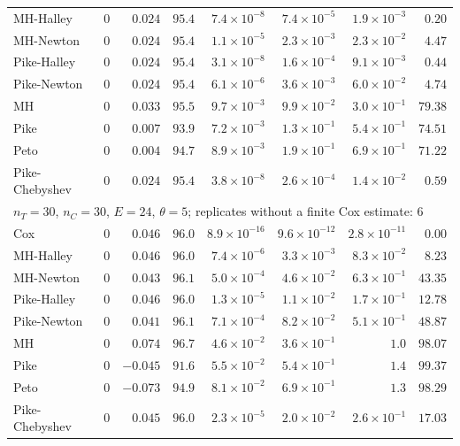 \begin{landscape}
\begin{longtable}{lrrrrrrr}
MH-Halley & 0 & $0.024$ & $95.4$ & $7.4 \times 10^{-8}$ & $7.4 \times 10^{-5}$ & $1.9 \times 10^{-3}$ & $0.20$ \\
MH-Newton & 0 & $0.024$ & $95.4$ & $1.1 \times 10^{-5}$ & $2.3 \times 10^{-3}$ & $2.3 \times 10^{-2}$ & $4.47$ \\
Pike-Halley & 0 & $0.024$ & $95.4$ & $3.1 \times 10^{-8}$ & $1.6 \times 10^{-4}$ & $9.1 \times 10^{-3}$ & $0.44$ \\
Pike-Newton & 0 & $0.024$ & $95.4$ & $6.1 \times 10^{-6}$ & $3.6 \times 10^{-3}$ & $6.0 \times 10^{-2}$ & $4.74$ \\
MH & 0 & $0.033$ & $95.5$ & $9.7 \times 10^{-3}$ & $9.9 \times 10^{-2}$ & $3.0 \times 10^{-1}$ & $79.38$ \\
Pike & 0 & $0.007$ & $93.9$ & $7.2 \times 10^{-3}$ & $1.3 \times 10^{-1}$ & $5.4 \times 10^{-1}$ & $74.51$ \\
Peto & 0 & $0.004$ & $94.7$ & $8.9 \times 10^{-3}$ & $1.9 \times 10^{-1}$ & $6.9 \times 10^{-1}$ & $71.22$ \\
Pike-Chebyshev & 0 & $0.024$ & $95.4$ & $3.8 \times 10^{-8}$ & $2.6 \times 10^{-4}$ & $1.4 \times 10^{-2}$ & $0.59$ \\
\multicolumn{8}{l}{$n_T = 30$, $n_C = 30$, $E = 24$, $\theta = 5$; replicates without a finite Cox estimate: 6} \\
Cox & 0 & $0.046$ & $96.0$ & $8.9 \times 10^{-16}$ & $9.6 \times 10^{-12}$ & $2.8 \times 10^{-11}$ & $0.00$ \\
MH-Halley & 0 & $0.046$ & $96.0$ & $7.4 \times 10^{-6}$ & $3.3 \times 10^{-3}$ & $8.3 \times 10^{-2}$ & $8.23$ \\
MH-Newton & 0 & $0.043$ & $96.1$ & $5.0 \times 10^{-4}$ & $4.6 \times 10^{-2}$ & $6.3 \times 10^{-1}$ & $43.35$ \\
Pike-Halley & 0 & $0.046$ & $96.0$ & $1.3 \times 10^{-5}$ & $1.1 \times 10^{-2}$ & $1.7 \times 10^{-1}$ & $12.78$ \\
Pike-Newton & 0 & $0.041$ & $96.1$ & $7.1 \times 10^{-4}$ & $8.2 \times 10^{-2}$ & $5.1 \times 10^{-1}$ & $48.87$ \\
MH & 0 & $0.074$ & $96.7$ & $4.6 \times 10^{-2}$ & $3.6 \times 10^{-1}$ & $1.0$ & $98.07$ \\
Pike & 0 & $-0.045$ & $91.6$ & $5.5 \times 10^{-2}$ & $5.4 \times 10^{-1}$ & $1.4$ & $99.37$ \\
Peto & 0 & $-0.073$ & $94.9$ & $8.1 \times 10^{-2}$ & $6.9 \times 10^{-1}$ & $1.3$ & $98.29$ \\
Pike-Chebyshev & 0 & $0.045$ & $96.0$ & $2.3 \times 10^{-5}$ & $2.0 \times 10^{-2}$ & $2.6 \times 10^{-1}$ & $17.03$ \\

\end{longtable}
\end{landscape}
